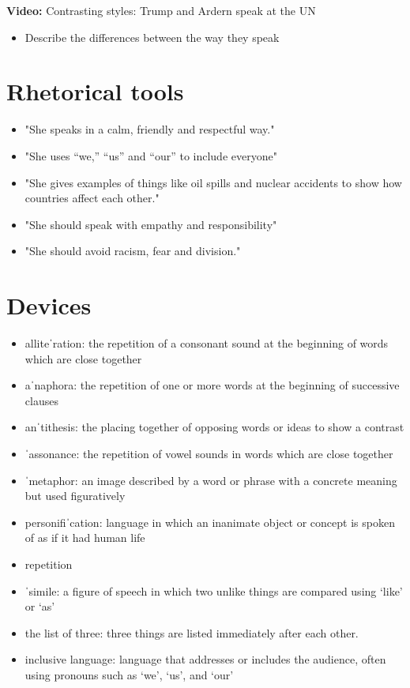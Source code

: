\documentclass[11pt,a4paper,oneside]{book}
\begin{document}
\par\noindent\textbf{Video:} Contrasting styles: Trump and Ardern speak at the UN\par\medskip

\begin{itemize}
\item Describe the differences between the way they speak
\end{itemize}

\section*{Rhetorical tools}

\begin{itemize}
\item "She speaks in a calm, friendly and respectful way."
\item "She uses “we,” “us” and “our” to include everyone"
\item "She gives examples of things like oil spills and nuclear accidents to show how countries affect each other."
\item "She should speak with empathy and responsibility"
\item "She should avoid racism, fear and division."
\end{itemize}

\section*{Devices}

\begin{itemize}
\item alliteˈration: the repetition of a consonant sound at the beginning of words which are close together
\item aˈnaphora: the repetition of one or more words at the beginning of successive clauses
\item anˈtithesis: the placing together of opposing words or ideas to show a contrast
\item ˈassonance: the repetition of vowel sounds in words which are close together
\item ˈmetaphor: an image described by a word or phrase with a concrete meaning but used figuratively
\item personifiˈcation: language in which an inanimate object or concept is spoken of as if it had human life
\item repetition
\item ˈsimile: a figure of speech in which two unlike things are compared using ‘like’ or ‘as’
\item the list of three: three things are listed immediately after each other.
\item inclusive language: language that addresses or includes the audience, often using pronouns such as ‘we’, ‘us’, and ‘our’
\end{itemize}
\end{document}
